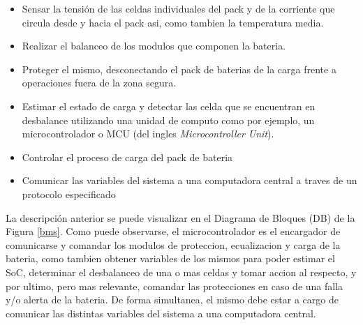 \documentclass[10pt,a4paper]{article}
\begin{document}
	\begin{itemize}
		\item Sensar la tensión de las celdas individuales del pack y de la 
        corriente que circula desde y hacia el pack asi, como tambien 
        la temperatura media.
		\item Realizar el balanceo de los modulos que componen la bateria.
		\item Proteger el mismo, desconectando el pack de baterias de la carga
            frente a operaciones fuera de la zona segura.
		\item Estimar el estado de carga y detectar las celda que se encuentran
            en desbalance utilizando una unidad de computo como por ejemplo, un
            microcontrolador o MCU (del ingles \emph{Microcontroller Unit}).
        \item Controlar el proceso de carga del pack de bateria
        \item Comunicar las variables del sistema a una computadora central a
        traves de un protocolo especificado
	\end{itemize}
	
	\noindent La descripción anterior se puede visualizar en el Diagrama de 
    Bloques (DB) de la Figura \ref{bms}. Como puede observarse, 
    el microcontrolador es el encargador de comunicarse y comandar los modulos 
    de proteccion, ecualizacion y carga de la bateria, como tambien obtener 
    variables de los mismos para poder estimar el SoC, determinar el 
    desbalanceo de una o mas celdas y tomar accion al respecto, y por ultimo, 
    pero mas relevante, comandar las protecciones en caso de una falla y/o 
    alerta de la bateria. De forma simultanea, el mismo debe estar a cargo de 
    comunicar las distintas variables del sistema a una computadora central.

    \clearpage
\end{document}
